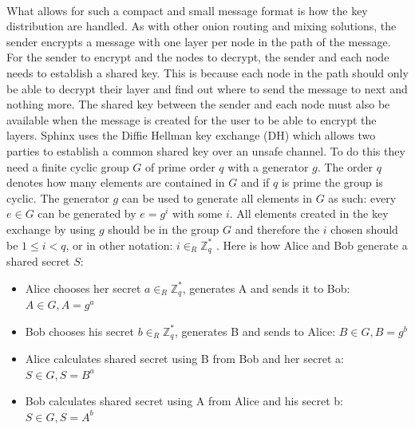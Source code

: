 \documentclass[informationsecurity]{gucmasterproject}
\begin{document}
\paragraph{}
What allows for such a compact and small message format is how the key distribution are handled. As with other onion routing and mixing solutions, the sender encrypts a message with one layer per node in the path of the message. For the sender to encrypt and the nodes to decrypt, the sender and each node needs to establish a shared key. This is because each node in the path should only be able to decrypt their layer and find out where to send the message to next and nothing more. The shared key between the sender and each node must also be available when the message is created for the user to be able to encrypt the layers.
Sphinx uses the Diffie Hellman key exchange (DH) \cite{diffie1976new} which allows two parties to establish a common shared key over an unsafe channel. 
To do this they need a finite cyclic group $G$ of prime order $q$ with a generator $g$. The order $q$ denotes how many elements are contained in $G$ and if $q$ is prime the group is cyclic. The generator $g$ can be used to generate all elements in $G$ as such: every $e\in G$ can be generated by $e=g^i$ with some $i$. All elements created in the key exchange by using $g$ should be in the group $G$ and therefore the $i$ chosen should be $1 \leq i < q$, or in other notation: $i \in _R \mathbb{Z}_q^*$ \cite{algebra}. Here is how Alice and Bob generate a shared secret $S$:

\begin{itemize}
    \item Alice chooses her secret $a \in _R \mathbb{Z}_q^*$, generates A and sends it to Bob:  $A\in G, A = g^a  $
    \item Bob chooses his secret $b \in _R \mathbb{Z}_q^*$, generates B and sends to Alice:  $ B\in G, B = g^b$
    \item Alice calculates shared secret using B from Bob and her secret a: $ S \in G, S = B^a $
    \item Bob calculates shared secret using A from Alice and his secret b: $ S \in G, S = A^b $
\end{itemize}
\end{document}
